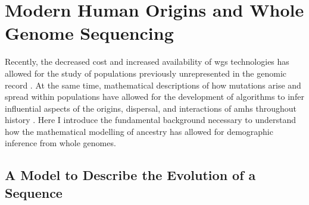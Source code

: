 
%





\section{Modern Human Origins and Whole Genome Sequencing}

Recently, the decreased cost and increased availability of \gls{wgs} technologies has allowed for the study of populations previously unrepresented in the genomic record \cite{D2019,Wong2013,Wu2021,GS2019,Fan2019a}. At the same time, mathematical descriptions of how mutations arise and spread within populations have allowed for the development of algorithms to infer influential aspects of the origins, dispersal, and interactions of \glspl{amh} throughout history \cite{Hodgson2010}. Here I introduce the fundamental background necessary to understand how the mathematical modelling of ancestry has allowed for demographic inference from whole genomes. 


\subsection{A Model to Describe the Evolution of a Sequence}

